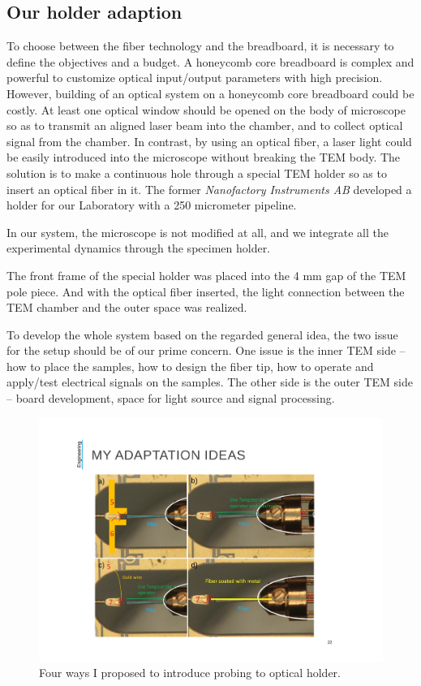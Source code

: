 \subsection{Our holder adaption}
To choose between the fiber technology and the breadboard, it is necessary to define the objectives and a budget. 
A honeycomb core breadboard is complex and powerful to customize optical input/output parameters with high precision. 
However, building of an optical system on a honeycomb core breadboard could be costly. 
At least one optical window should be opened on the body of microscope so as to transmit an aligned laser beam into the chamber, and to collect optical signal from the chamber. 
In contrast, by using an optical fiber, a laser light could be easily introduced into the microscope without breaking the TEM body. 
The solution is to make a continuous hole through a special TEM holder so as to insert an optical fiber in it. The former {\em Nanofactory Instruments AB} developed a holder for our Laboratory with a 250 micrometer pipeline. 

In our system, the microscope is not modified at all, and we integrate all the experimental dynamics through the specimen holder. 

The front frame of the special holder was placed into the 4 mm gap of the TEM pole
piece. And with the optical fiber inserted, the light connection between the TEM chamber and the outer space was realized. 

To develop the whole system based on the regarded general idea, the two issue for the setup should be of our prime concern. One issue is the inner TEM side – how to place the samples, how to design the fiber tip, how to operate and apply/test electrical signals on the samples. The other side is the outer TEM side – board development, space for light source and signal processing.  

\begin{figure}  
\centering
\includegraphics[width=320pt, angle=-90]{figures/figure2_4ways}
\caption[Proposed four ways of holder adaption]{Four ways I proposed to introduce probing to optical holder.
\label{fig:4ways}}
\end{figure}

